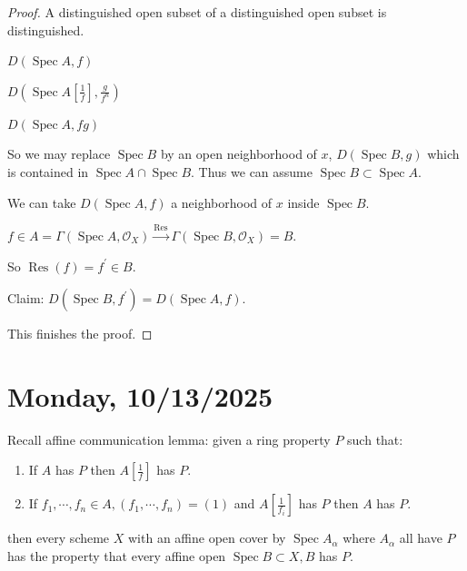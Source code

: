 \documentclass{article}
\theoremstyle{definition}
\begin{document}
    \begin{proof}
        A distinguished open subset of a distinguished open subset is distinguished.

        \(D(\operatorname{Spec} A, f)\)

        \(D\left(\operatorname{Spec} A \left[ \frac{1}{f} \right], \frac{g}{f^n}\right)\) 

        \(D(\operatorname{Spec} A, fg)\)

        So we may replace \(\operatorname{Spec} B\) by an open neighborhood of \(x\), \(D(\operatorname{Spec} B, g)\) which is contained in \(\operatorname{Spec} A \cap \operatorname{Spec} B\). Thus we can assume \(\operatorname{Spec} B \subset \operatorname{Spec} A\).

        We can take \(D(\operatorname{Spec} A, f)\) a neighborhood of \(x\) inside \(\operatorname{Spec} B\).

        \(f\in A = \Gamma (\operatorname{Spec} A, \mathcal{O}_X) \xrightarrow{\operatorname{Res}} \Gamma(\operatorname{Spec} B, \mathcal{O}_X) = B\).

        So \(\operatorname{Res}(f) = f^{\prime} \in B\).

        Claim: \(D(\operatorname{Spec} B, f^{\prime}) = D(\operatorname{Spec} A, f)\).

        This finishes the proof.

    \end{proof}

    \section*{Monday, 10/13/2025}
    
    Recall affine communication lemma: given a ring property \(P\) such that:

    \begin{enumerate}[label=\arabic*)]
        \item If \(A\) has \(P\) then \(A \left[ \frac{1}{f} \right] \) has \(P\).
        \item If \(f_1, \cdots , f_n \in A, (f_1, \cdots , f_n) = (1)\) and \(A \left[ \frac{1}{f_i} \right] \) has \(P\) then \(A\) has \(P\). 
    \end{enumerate} 

    then every scheme \(X\) with an affine open cover by \(\operatorname{Spec} A_\alpha\) where \(A_\alpha\) all have \(P\) has the property that every affine open \(\operatorname{Spec} B \subset X, B\) has \(P\).
\end{document}
